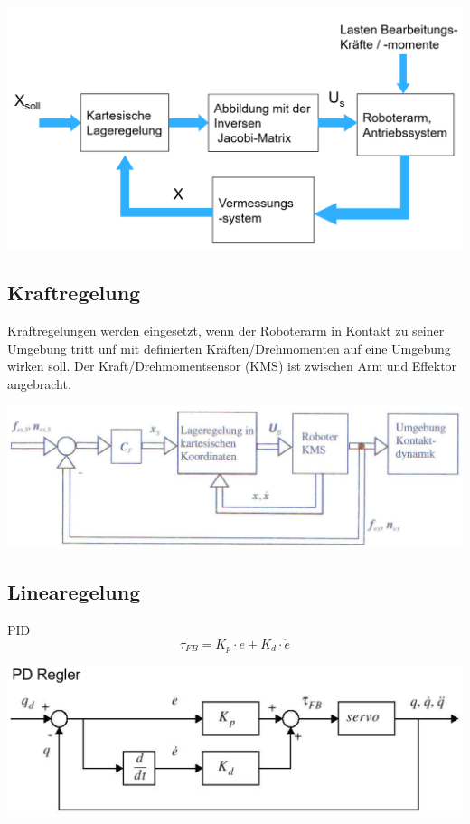 \begin{minipage}{0.5\linewidth}
    \includegraphics[width=\linewidth]{./bilder/KartLageRegelung}
\end{minipage}

\begin{minipage}{0.5\linewidth}
    \subsection{Kraftregelung }
    Kraftregelungen werden eingesetzt, wenn der Roboterarm in Kontakt zu seiner Umgebung tritt unf mit definierten Kräften/Drehmomenten auf eine Umgebung wirken soll.
    Der Kraft/Drehmomentsensor (KMS) ist zwischen Arm und Effektor angebracht.
\end{minipage}
\begin{minipage}{0.5\linewidth}
    \includegraphics[width=\linewidth]{./bilder/KraftRegelung}
\end{minipage}

\begin{minipage}[b]{0.5\linewidth}
    \subsection{Linearegelung}
    PID 
    \[ \tau_{FB}=K_p\cdot e + K_d\cdot \dot{e} \]
\end{minipage}
\begin{minipage}{0.5\linewidth}
    \includegraphics[width=\linewidth]{./bilder/PDRegler}
\end{minipage}


